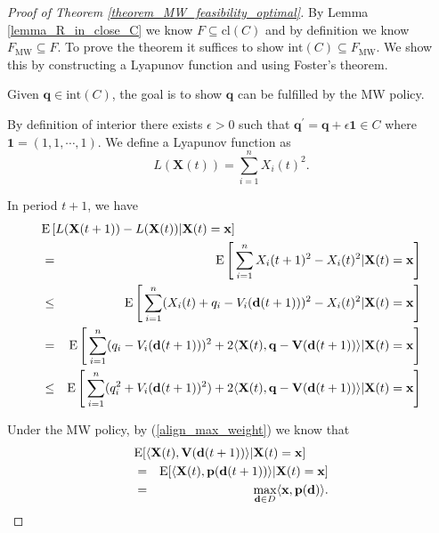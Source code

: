 \documentclass[prodmode,acmtompecs]{acmsmall}
\newcommand{\reqvec}{\mathbf{q}}
\newcommand{\reqscalar}{q}
\newcommand{\feasibilityRegion}{F}
\begin{document}
\begin{proof}[Proof of Theorem \ref{theorem_MW_feasibility_optimal}]
By Lemma \ref{lemma_R_in_close_C} we know $F \subseteq \text{cl}(C)$ and by definition we know $\feasibilityRegion_{\text{MW}} \subseteq \feasibilityRegion$. To prove the theorem it suffices to show $\text{int}(C) \subseteq \feasibilityRegion_\text{MW}$. We show this by constructing a Lyapunov function and using Foster's theorem. 

Given $\reqvec \in \text{int}(C)$, the goal is to show $\reqvec$ can be fulfilled by the MW policy. 

By definition of interior there exists $\epsilon > 0$ such that $\reqvec^\prime = \reqvec + \epsilon \mathbf{1} \in C$ where $\mathbf{1} = (1, 1, \cdots, 1)$. We define a Lyapunov function as 
$$
L(\mathbf{X}(t)) = \sum\limits_{i=1}^{n} X_i(t)^2. 
$$

In period $t+1$, we have
\begin{eqnarray}
\lefteqn{ \expectation\left[ L(\mathbf{X}(t+1)) - L(\mathbf{X}(t)) | \mathbf{X}(t) = \mathbf{x} \right]} \notag \\
& = & \expectation\Bigg[\sum\limits_{i=1}^{n} X_i(t+1)^2 - X_i(t)^2 | \mathbf{X}(t) = \mathbf{x}\Bigg]	\notag	\\
& \leq & \expectation\Bigg[\sum\limits_{i=1}^{n} (X_i(t) + \reqscalar_i \notag - V_i(\mathbf{d}(t+1)))^2 - X_i(t)^2 | \mathbf{X}(t) = \mathbf{x}\Bigg] \notag \\
& = & \expectation\Bigg[\sum\limits_{i=1}^{n} (\reqscalar_i - V_i(\mathbf{d}(t+1)))^2 + 2 \langle \mathbf{X}(t), \reqvec - \mathbf{V}(\mathbf{d}(t+1)) \rangle | \mathbf{X}(t) = \mathbf{x}\Bigg] 	\notag \\
& \leq & \expectation\Bigg[\sum\limits_{i=1}^{n} (\reqscalar_i^2 + V_i(\mathbf{d}(t+1))^2) + 2\langle \mathbf{X}(t), \reqvec - \mathbf{V}(\mathbf{d}(t+1)) \rangle | \mathbf{X}(t) = \mathbf{x}\Bigg] \label{align_drift}
\end{eqnarray}

Under the MW policy, by (\ref{align_max_weight}) we know that
\begin{eqnarray*}
\lefteqn{\expectation[\langle \mathbf{X}(t), \mathbf{V}(\mathbf{d}(t+1)) \rangle | \mathbf{X}(t) = \mathbf{x}]}	\\ 
& = & \expectation[\langle \mathbf{X}(t), \mathbf{p}(\mathbf{d}(t+1)) \rangle | \mathbf{X}(t) = \mathbf{x}]	\\
& = & \max\limits_{\mathbf{d} \in D} \langle \mathbf{x}, \mathbf{p}(\mathbf{d}) \rangle. 
\end{eqnarray*}


\end{proof}
\end{document}

